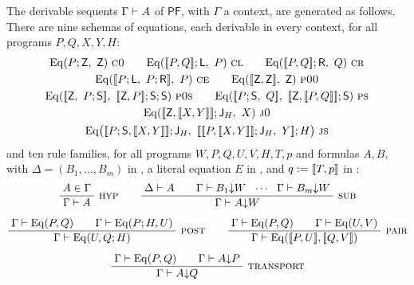 \begin{definition}
\label{base:def:pf}
The derivable sequents $\Gamma\vdash A$ of $\mathsf{PF}$, with $\Gamma$ a
context, are generated as follows.  There are nine schemas of equations,
each derivable in every context, for all programs $P,Q,X,Y,H$:
\begin{gather*}
 \mathrm{Eq}(P;\mathsf Z,\ \mathsf Z)\ \rulename{C0}\qquad
 \mathrm{Eq}(\llbracket P,Q\rrbracket;\mathsf L,\ P)\ \rulename{CL}\qquad
 \mathrm{Eq}(\llbracket P,Q\rrbracket;\mathsf R,\ Q)\ \rulename{CR}\\
 \mathrm{Eq}(\llbracket P;\mathsf L,\ P;\mathsf R\rrbracket,\ P)\ \rulename{CE}\qquad
 \mathrm{Eq}(\llbracket\mathsf Z,\mathsf Z\rrbracket,\ \mathsf Z)\ \rulename{P00}\\
 \mathrm{Eq}(\llbracket\mathsf Z,\ P;\mathsf S\rrbracket,\
   \llbracket\mathsf Z,P\rrbracket;\mathsf S;\mathsf S)\ \rulename{P0S}\qquad
 \mathrm{Eq}(\llbracket P;\mathsf S,\ Q\rrbracket,\
   \llbracket\mathsf Z,\llbracket P,Q\rrbracket\rrbracket;\mathsf S)\ \rulename{PS}\\
 \mathrm{Eq}(\llbracket\mathsf Z,\llbracket X,Y\rrbracket\rrbracket;\mathsf J_H,\ X)\ \rulename{J0}\\
 \mathrm{Eq}\bigl(\llbracket P;\mathsf S,\llbracket X,Y\rrbracket\rrbracket;\mathsf J_H,\
   \llbracket\llbracket P,\llbracket X,Y\rrbracket\rrbracket;\mathsf J_H,\ Y\rrbracket;H\bigr)\ \rulename{JS}
\end{gather*}
and ten rule families, for all programs $W,P,Q,U,V,H,T,p$ and formulas
$A,B$, with $\Delta=(B_1,\dots,B_m)$ in \rulename{Sub}, a literal equation
$E$ in , and $q\mathrel{:=}[\![ T,p]\!]$ in
\rulename{DI}:
\begin{gather*}
 \infrule{A\in\Gamma}{\Gamma\proves A}\ \rulename{Hyp}
 \qquad
 \infrule{\Delta\proves A\qquad\Gamma\proves B_1{\downarrow}W\ \ \cdots\ \
   \Gamma\proves B_m{\downarrow}W}{\Gamma\proves A{\downarrow}W}\ \rulename{Sub}
 \\[1.2ex]
 \infrule{\Gamma\proves\mathrm{Eq}(P,Q)\qquad\Gamma\proves\mathrm{Eq}(P;H,U)}
         {\Gamma\proves\mathrm{Eq}(U,Q;H)}\ \rulename{Post}
 \qquad
 \infrule{\Gamma\proves\mathrm{Eq}(P,Q)\qquad\Gamma\proves\mathrm{Eq}(U,V)}
         {\Gamma\proves\mathrm{Eq}(\llbracket P,U\rrbracket,\llbracket Q,V\rrbracket)}\
         \rulename{Pair}
 \\[1.2ex]
 \infrule{\Gamma\proves\mathrm{Eq}(P,Q)\qquad\Gamma\proves A{\downarrow}P}
         {\Gamma\proves A{\downarrow}Q}\ \rulename{Transport}

\end{gather*}
\end{definition}
